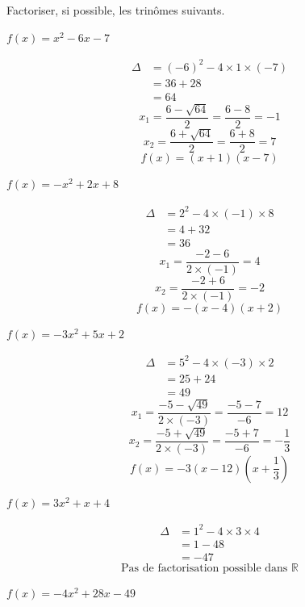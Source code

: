 \documentclass[11pt,a4paper]{article}  %
\begin{document}
\exercice{}

Factoriser, si possible, les trinômes suivants.
\begin{enumMet}
	\item $f(x)=x^2-6 x-7$
	\begin{corrBox}
		\begin{align*}
			\Delta &= (-6)^2 - 4 \times 1 \times (-7) \\
			&= 36 + 28 \\
			&= 64
		\end{align*}
		\[
		x_1 = \frac{6 - \sqrt{64}}{2} = \frac{6 - 8}{2} = -1
		\]
		\[
		x_2 = \frac{6 + \sqrt{64}}{2} = \frac{6 + 8}{2} = 7
		\]
		\[
		f(x) = (x + 1)(x - 7)
		\]		
	\end{corrBox}
	\item $f(x)=-x^2+2 x+8$
	\begin{corrBox}
		\begin{align*}
			\Delta &= 2^2 - 4 \times (-1) \times 8 \\
			&= 4 + 32 \\
			&= 36
		\end{align*}
		\[
		x_1 = \frac{-2 - 6}{2\times (-1)} = 4
		\]
		\[
		x_2 = \frac{-2+6}{2\times (-1)} = -2
		\]
		\[
		f(x) = -(x -4)(x +2)
		\]		
	\end{corrBox}
	\item $f(x)=-3 x^2+5 x+2$
	\begin{corrBox}
		\begin{align*}
			\Delta &= 5^2 - 4 \times (-3) \times 2 \\
			&= 25 + 24 \\
			&= 49
		\end{align*}
		\[
		x_1 = \frac{-5 - \sqrt{49}}{2 \times (-3)} = \frac{-5 - 7}{-6} = 12
		\]
		\[
		x_2 = \frac{-5 + \sqrt{49}}{2 \times (-3)} = \frac{-5 + 7}{-6} = -\frac{1}{3}
		\]
		\[
		f(x) = -3(x -12)\left(x + \frac{1}{3}\right)
		\]
	\end{corrBox}
	\item $f(x)=3 x^2+x+4$
	\begin{corrBox}
		\begin{align*}
			\Delta &= 1^2 - 4 \times 3 \times 4 \\
			&= 1 - 48 \\
			&= -47
		\end{align*}
		\[
		\text{Pas de factorisation possible dans } \mathbb{R}
		\]		
	\end{corrBox}
	\item $f(x)=-4 x^2+28 x-49$

\end{enumMet}
\end{document}
